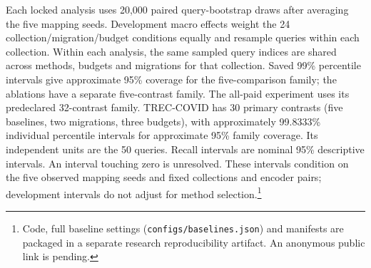 Each locked analysis uses 20,000 paired query-bootstrap draws after
averaging the five mapping seeds. Development macro effects weight the
24 collection/migration/budget conditions equally and resample queries
within each collection. Within each analysis, the same sampled query indices
are shared across methods, budgets and migrations for that collection.
Saved 99\% percentile intervals give approximate
95\% coverage for the five-comparison family; the ablations have a separate
five-contrast family. The all-paid experiment uses its predeclared
32-contrast family. TREC-COVID has 30 primary contrasts
(five baselines, two migrations, three budgets), with approximately
99.8333\% individual percentile intervals for approximate 95\% family
coverage. Its independent units are the 50 queries. Recall intervals are
nominal 95\% descriptive intervals. An interval touching zero is unresolved.
These intervals condition on the five observed mapping seeds and fixed
collections and encoder pairs; development intervals do not adjust for
method selection.\footnote{Code, full baseline settings
(\texttt{configs/baselines.json}) and manifests are packaged in a separate
research reproducibility artifact. An anonymous public link is pending.}
